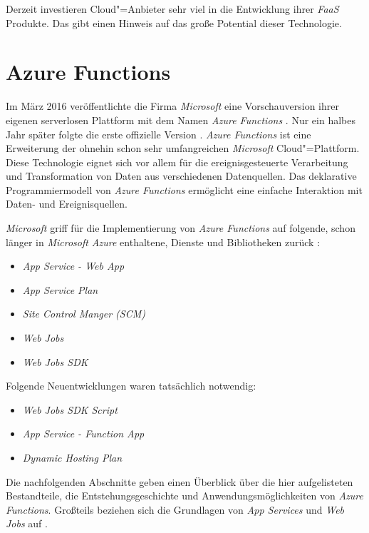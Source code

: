 Derzeit investieren Cloud"=Anbieter sehr viel in die Entwicklung ihrer \textit{FaaS} Produkte. Das gibt einen Hinweis auf das große Potential dieser Technologie.

\section{Azure Functions}

Im März 2016 veröffentlichte die Firma \textit{Microsoft} eine Vorschauversion ihrer eigenen serverlosen Plattform mit dem Namen \textit{Azure Functions} \cite{AzFunIntro}. Nur ein halbes Jahr später folgte die erste offizielle Version \cite{AzFunGA}. \textit{Azure Functions} ist eine Erweiterung der ohnehin schon sehr umfangreichen \textit{Microsoft} Cloud"=Plattform. Diese Technologie eignet sich vor allem für die ereignisgesteuerte Verarbeitung und Transformation von Daten aus verschiedenen Datenquellen. Das deklarative Programmiermodell von \textit{Azure Functions} ermöglicht eine einfache Interaktion mit Daten- und Ereignisquellen. 

\textit{Microsoft} griff für die Implementierung von \textit{Azure Functions} auf folgende, schon länger in \textit{Microsoft Azure} enthaltene, Dienste und Bibliotheken zurück \cite{AzFunJourney}:

\begin{itemize}
	\item \textit{App Service - Web App}
	\item \textit{App Service Plan}
	\item \textit{Site Control Manger (SCM)}
	\item \textit{Web Jobs}
	\item \textit{Web Jobs SDK}
\end{itemize}
Folgende Neuentwicklungen waren tatsächlich notwendig:
\begin{itemize}
	\item \textit{Web Jobs SDK Script}
	\item \textit{App Service - Function App}
	\item \textit{Dynamic Hosting Plan}
\end{itemize}

Die nachfolgenden Abschnitte geben einen Überblick über die hier aufgelisteten Bestandteile, die Entstehungsgeschichte und Anwendungsmöglichkeiten von \textit{Azure Functions}. Großteils beziehen sich die Grundlagen von \textit{App Services} und \textit{Web Jobs} auf \cite{AzWebEssentials4Devs}.

